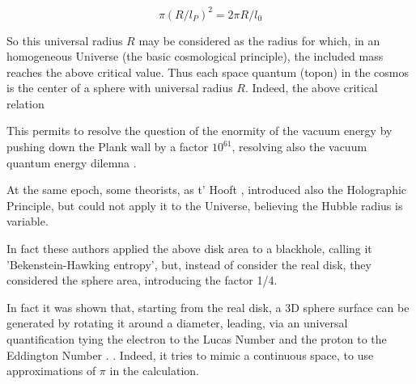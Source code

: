 \documentclass[a4paper,9pt]{article}
\begin{document}
    \begin{equation}
        \pi (R/l_P)^2 = 2\pi R/l_0
    \end{equation}
    
    So this universal radius $R$ may be considered as the radius for which, in an homogeneous Universe (the basic cosmological principle), the included mass reaches the above critical value\cite{Sanchez}. Thus each space quantum (topon) in the cosmos is the center of a sphere with universal radius $R$. Indeed, the above critical relation  
    
    
    This permits to resolve the question of the enormity of the vacuum energy by pushing down the Plank wall by a factor $10^61$, resolving also the vacuum quantum energy dilemna  \cite{Sanchez} . 
    
    At the same epoch, some theorists, as t' Hooft \cite{Hooft}, introduced also the Holographic Principle, but could not apply it to the Universe, believing the Hubble radius is variable.
    
    
    In fact these authors applied the above disk area to a blackhole, calling it 'Bekenstein-Hawking entropy'\cite{Bekenstein}, but, instead of consider the real disk, they considered the sphere area, introducing the factor 1/4. 
    
    
    In fact it was shown that, starting from the real disk, a 3D sphere surface can be generated by rotating it around a diameter, leading, via an universal quantification tying the electron to the Lucas Number and the proton to the Eddington Number \cite{Sanchez}. . Indeed, it tries to mimic a continuous space, to use approximations of $\pi$ in  the calculation.
    
\end{document}
